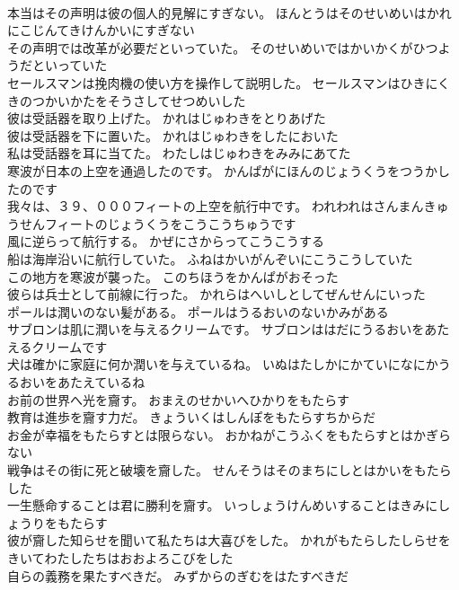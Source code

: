 \documentclass[8pt]{extreport}
\begin{document}
\begin{CJK}{UTF8}{min}
\\	本当はその声明は彼の個人的見解にすぎない。	ほんとうはそのせいめいはかれにこじんてきけんかいにすぎない 
\\	その声明では改革が必要だといっていた。	そのせいめいではかいかくがひつようだといっていた 
\\	セールスマンは挽肉機の使い方を操作して説明した。	セールスマンはひきにくきのつかいかたをそうさしてせつめいした 
\\	彼は受話器を取り上げた。	かれはじゅわきをとりあげた 
\\	彼は受話器を下に置いた。	かれはじゅわきをしたにおいた 
\\	私は受話器を耳に当てた。	わたしはじゅわきをみみにあてた 
\\	寒波が日本の上空を通過したのです。	かんぱがにほんのじょうくうをつうかしたのです 
\\	我々は、３９、０００フィートの上空を航行中です。	われわれはさんまんきゅうせんフィートのじょうくうをこうこうちゅうです 
\\	風に逆らって航行する。	かぜにさからってこうこうする 
\\	船は海岸沿いに航行していた。	ふねはかいがんぞいにこうこうしていた 
\\	この地方を寒波が襲った。	このちほうをかんぱがおそった 
\\	彼らは兵士として前線に行った。	かれらはへいしとしてぜんせんにいった 
\\	ポールは潤いのない髪がある。	ポールはうるおいのないかみがある 
\\	サブロンは肌に潤いを与えるクリームです。	サブロンははだにうるおいをあたえるクリームです 
\\	犬は確かに家庭に何か潤いを与えているね。	いぬはたしかにかていになにかうるおいをあたえているね 
\\	お前の世界へ光を齎す。	おまえのせかいへひかりをもたらす 
\\	教育は進歩を齎す力だ。	きょういくはしんぽをもたらすちからだ 
\\	お金が幸福をもたらすとは限らない。	おかねがこうふくをもたらすとはかぎらない 
\\	戦争はその街に死と破壊を齎した。	せんそうはそのまちにしとはかいをもたらした 
\\	一生懸命することは君に勝利を齎す。	いっしょうけんめいすることはきみにしょうりをもたらす 
\\	彼が齎した知らせを聞いて私たちは大喜びをした。	かれがもたらしたしらせをきいてわたしたちはおおよろこびをした 
\\	自らの義務を果たすべきだ。	みずからのぎむをはたすべきだ 

\end{CJK}
\end{document}
